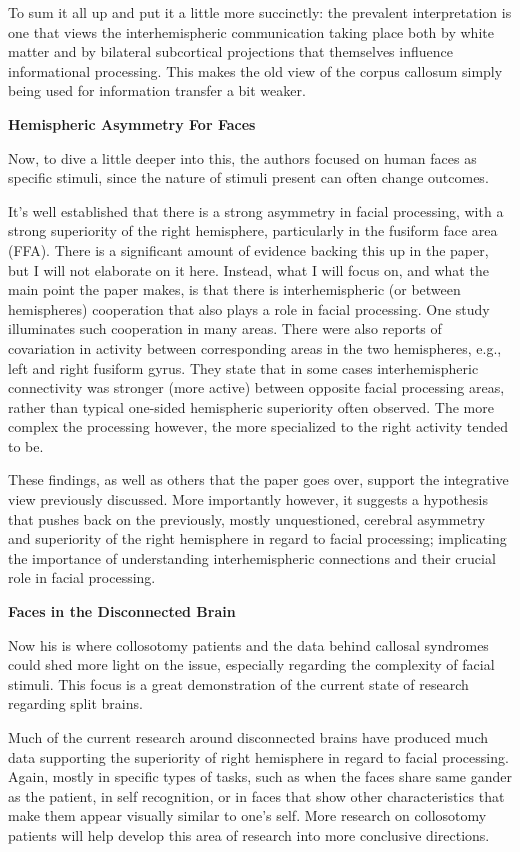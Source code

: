 \documentclass[basic]{inVerba-notes}
\begin{document}
To sum it all up and put it a little more succinctly: the prevalent interpretation is one that views the interhemispheric communication taking place both by white matter and by bilateral subcortical projections that themselves influence informational processing. This makes the old view of the corpus callosum simply being used for information transfer a bit weaker.

\textbf{Hemispheric Asymmetry For Faces}

Now, to dive a little deeper into this, the authors focused on human faces as specific stimuli, since the nature of stimuli present can often change outcomes.

It's well established that there is a strong asymmetry in facial processing, with a strong superiority of the right hemisphere, particularly in the fusiform face area (FFA). There is a significant amount of evidence backing this up in the paper, but I will not elaborate on it here. Instead, what I will focus on, and what the main point the paper makes, is that there is interhemispheric (or between hemispheres) cooperation that also plays a role in facial processing. One study illuminates such cooperation in many areas. There were also reports of covariation in activity between corresponding areas in the two hemispheres, e.g., left and right fusiform gyrus. They state that in some cases interhemispheric connectivity was stronger (more active) between opposite facial processing areas, rather than typical one-sided hemispheric superiority often observed. The more complex the processing however, the more specialized to the right activity tended to be. 

These findings, as well as others that the paper goes over, support the integrative view previously discussed. More importantly however, it suggests a hypothesis that pushes back on the previously, mostly unquestioned, cerebral asymmetry and superiority of the right hemisphere in regard to facial processing; implicating the importance of understanding interhemispheric connections and their crucial role in facial processing.

\textbf{Faces in the Disconnected Brain}

Now his is where collosotomy patients and the data behind callosal syndromes could shed more light on the issue, especially regarding the complexity of facial stimuli. This focus is a great demonstration of the current state of research regarding split brains. 

Much of the current research around disconnected brains have produced much data supporting the superiority of right hemisphere in regard to facial processing. Again, mostly in specific types of tasks, such as when the faces share same gander as the patient, in self recognition, or in faces that show other characteristics that make them appear visually similar to one's self. More research on collosotomy patients will help develop this area of research into more conclusive directions. 
\end{document}
